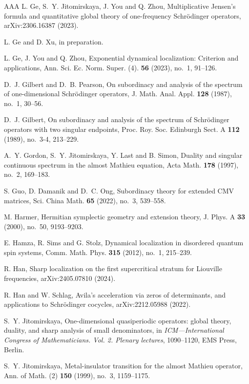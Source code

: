 \documentclass[11pt]{amsart}
\theoremstyle{remark}
\theoremstyle{definition}
\begin{document}
\begin{thebibliography}{AAA}
L. Ge, S.~Y. Jitomirskaya, J. You and Q. Zhou, Multiplicative Jensen's formula and quantitative global theory of one-frequency Schr\" odinger operators, arXiv:2306.16387 (2023).

L. Ge and D. Xu, in preparation.

L. Ge,  J. You and Q. Zhou, Exponential dynamical localization: Criterion and applications, Ann.
Sci. Ec. Norm. Super. (4). {\bf 56} (2023), no.~1, 91--126.

D.~J. Gilbert and D.~B. Pearson, On subordinacy and analysis of the spectrum of one-dimensional Schr\"odinger operators, J. Math. Anal. Appl. {\bf 128} (1987), no.~1, 30--56.

D.~J. Gilbert, On subordinacy and analysis of the spectrum of Schr\"odinger operators with two singular endpoints, Proc. Roy. Soc. Edinburgh Sect. A {\bf 112} (1989), no.~3-4, 213--229.

A.~Y. Gordon, S.~Y. Jitomirskaya, Y. Last and B. Simon,  Duality and singular continuous spectrum in the almost Mathieu equation, Acta Math. {\bf 178} (1997), no.~2, 169--183.

S. Guo, D. Damanik and D.~C. Ong, Subordinacy theory for extended CMV matrices, Sci. China Math. {\bf 65} (2022), no.~3, 539--558.

M. Harmer, Hermitian symplectic geometry and extension theory, J. Phys. A {\bf 33} (2000), no.~50, 9193--9203.

E. Hamza, R. Sims and G. Stolz, Dynamical localization in disordered quantum spin systems, Comm. Math. Phys. {\bf 315} (2012), no.~1, 215--239.

 R. Han, Sharp localization on the first supercritical stratum for Liouville frequencies, arXiv:2405.07810 (2024).

 R. Han and W. Schlag,  Avila's acceleration via zeros of
  determinants, and applications to Schr\"odinger
  cocycles, arXiv:2212.05988 (2022).



S.~Y. Jitomirskaya, One-dimensional quasiperiodic operators: global theory, duality, and sharp analysis of small denominators, in {\it ICM---International Congress of Mathematicians. Vol. 2. Plenary lectures}, 1090--1120, EMS Press, Berlin.

S.~Y. Jitomirskaya, Metal-insulator transition for the almost Mathieu operator, Ann. of Math. (2) {\bf 150} (1999), no.~3, 1159--1175.


\end{thebibliography}
\end{document}
